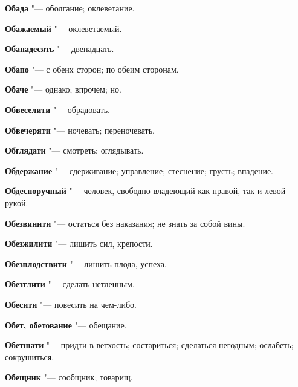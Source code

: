 \begin{mymulticols}{2}
\noindent\textbf{Обада} "--- оболгание; оклеветание. 




\noindent\textbf{Обажаемый} "--- оклеветаемый. 




\noindent\textbf{Обанадесять} "--- двенадцать. 




\noindent\textbf{Обапо} "--- с обеих сторон; по обеим сторонам. 




\noindent\textbf{Обаче} "--- однако; впрочем; но. 




\noindent\textbf{Обвеселити} "--- обрадовать. 




\noindent\textbf{Обвечеряти} "--- ночевать; переночевать. 




\noindent\textbf{Обглядати} "--- смотреть; оглядывать. 




\noindent\textbf{Обдержание} "--- сдерживание; управление; стеснение; грусть; впадение. 




\noindent\textbf{Обдесноручный} "--- человек, свободно владеющий как правой, так и левой рукой. 




\noindent\textbf{Обезвинити} "--- остаться без наказания; не знать за собой вины. 




\noindent\textbf{Обезжилити} "--- лишить сил, крепости. 




\noindent\textbf{Обезплодствити} "--- лишить плода, успеха. 




\noindent\textbf{Обезтлити} "--- сделать нетленным. 




\noindent\textbf{Обесити} "--- повесить на чем-либо. 




\noindent\textbf{Обет, обетование} "--- обещание. 




\noindent\textbf{Обетшати} "--- придти в ветхость; состариться; сделаться негодным; ослабеть; сокрушиться. 




\noindent\textbf{Обещник} "--- сообщник; товарищ. 





\end{mymulticols}
